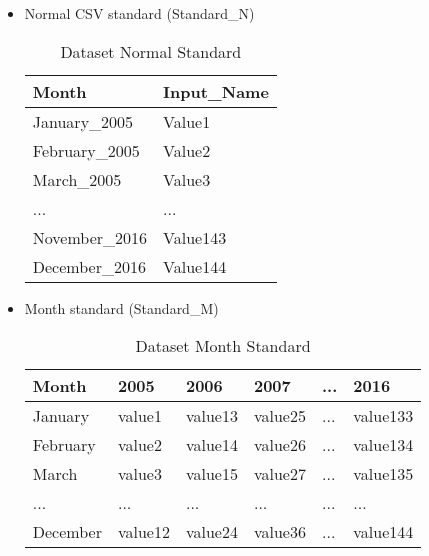 \begin{itemize}
\item Normal CSV standard (Standard\_N)
\begin{table}[ht] 
    \centering 
    \begin{tabular}{ | l | l |}
        \hline
       	Month & Input\_Name\\ \hline
        January\_2005 & Value1 \\ \hline
        February\_2005 & Value2\\ \hline
        March\_2005 & Value3\\ \hline
        ... & ...\\ \hline
        November\_2016 & Value143\\ \hline
        December\_2016 & Value144\\ \hline
    \end{tabular}
    \caption[Dataset Normal Standard]{Dataset Normal Standard}
    \label{table: Dataset_Normal_Standard} 
\end{table}    

\item Month standard (Standard\_M)
\begin{table}[ht] 
    \centering 
    \begin{tabular}{ | l | l | l | l | l | l |}
        \hline
       	Month & 2005 & 2006 & 2007 & ... & 2016\\ \hline
        January & value1 & value13 & value25 & ... & value133\\ \hline
        February & value2 & value14 & value26 & ... & value134\\ \hline
        March & value3 & value15 & value27 & ... & value135\\ \hline
        ... & ... & ... & ... & ... & ...\\ \hline
        December & value12 & value24 & value36 & ... & value144\\ \hline
    \end{tabular}
    \caption[Dataset Month Standard]{Dataset Month Standard}
    \label{table: Dataset_Month_Standard} 
\end{table}  


\end{itemize}
